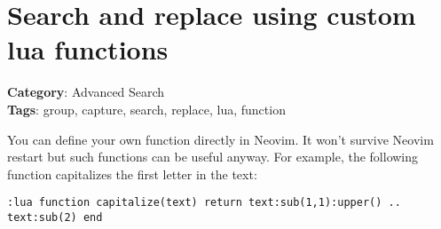 \section{Search and replace using custom lua functions}

\textbf{Category}: Advanced Search\\ \textbf{Tags}: group, capture, search, replace, lua, function
\vspace{0.5cm}

You can define your own function directly in Neovim. It won't survive Neovim restart but such functions can be useful anyway. For example, the following function capitalizes the first letter in the text:

\begin{Exa*}{}
\begin{Verbatim}[fontsize=\footnotesize, breaklines, breakanywhere]
:lua function capitalize(text) return text:sub(1,1):upper() .. text:sub(2) end
\end{Verbatim}
\end{Exa*}

